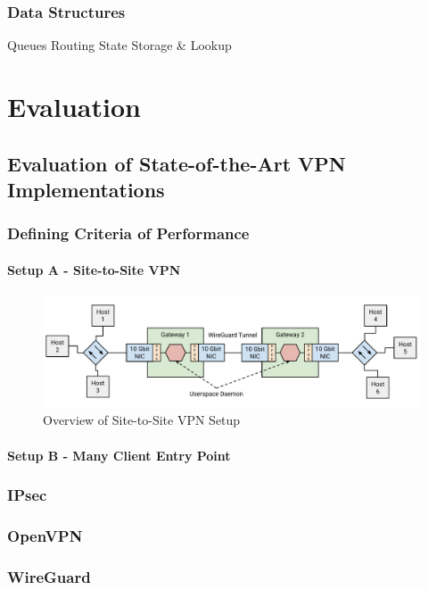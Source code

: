 \documentclass[IN,11pt,twoside,openright,master,english]{tumthesis}
\begin{document}
	\subsection{Data Structures}
		Queues
		Routing
		State Storage \& Lookup


\chapter{Evaluation}
\label{chap:evaluation}

\section{Evaluation of State-of-the-Art VPN Implementations}
	\subsection{Defining Criteria of Performance}
	\subsubsection{Setup A - Site-to-Site VPN}
	\begin{figure}[h]
		\centering
		\includegraphics[width=1\linewidth]{figures/PoC-Overview}
		\caption{Overview of Site-to-Site VPN Setup}
		\label{fig:poc-overview}
	\end{figure}
	
	\subsubsection{Setup B - Many Client Entry Point}
	
	\subsection{IPsec}
	\subsection{OpenVPN}
	\subsection{WireGuard}
\end{document}
